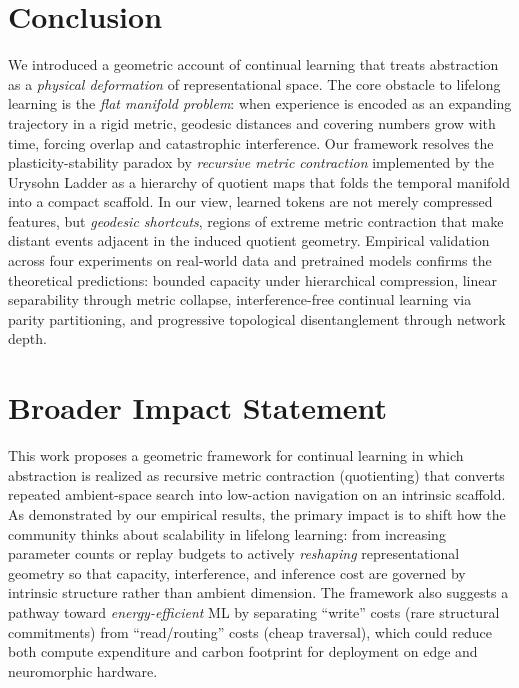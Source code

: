 \documentclass{article}
\begin{document}
\section{Conclusion}
\vspace{-0.1in}
We introduced a geometric account of continual learning that treats abstraction as a \emph{physical deformation} of representational space. The core obstacle to lifelong learning is the \emph{flat manifold problem}: when experience is encoded as an expanding trajectory in a rigid metric, geodesic distances and covering numbers grow with time, forcing overlap and catastrophic interference. Our framework resolves the plasticity-stability paradox by \emph{recursive metric contraction} implemented by the Urysohn Ladder as a hierarchy of quotient maps that folds the temporal manifold into a compact scaffold. In our view, learned tokens are not merely compressed features, but \emph{geodesic shortcuts}, regions of extreme metric contraction that make distant events adjacent in the induced quotient geometry. Empirical validation across four experiments on real-world data and pretrained models confirms the theoretical predictions: bounded capacity under hierarchical compression, linear separability through metric collapse, interference-free continual learning via parity partitioning, and progressive topological disentanglement through network depth. 
 
\section*{Broader Impact Statement}
 
This work proposes a geometric framework for continual learning in which abstraction is realized as recursive metric contraction (quotienting) that converts repeated ambient-space search into low-action navigation on an intrinsic scaffold. As demonstrated by our empirical results, the primary impact is to shift how the community thinks about scalability in lifelong learning: from increasing parameter counts or replay budgets to actively \emph{reshaping} representational geometry so that capacity, interference, and inference cost are governed by intrinsic structure rather than ambient dimension. The framework also suggests a pathway toward \emph{energy-efficient} ML by separating ``write'' costs (rare structural commitments) from ``read/routing'' costs (cheap traversal), which could reduce both compute expenditure and carbon footprint for deployment on edge and neuromorphic hardware.
 
\end{document}
